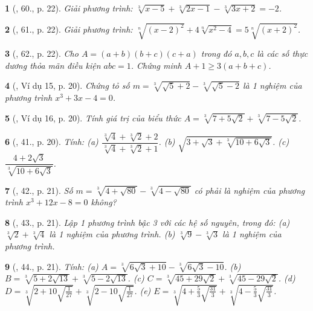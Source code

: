 \documentclass{article}
\newtheorem{baitoan}{}
\begin{document}
\begin{baitoan}[\cite{Tuyen_Toan_9_old}, 60., p. 22]
	Giải phương trình: $\sqrt[3]{x - 5} + \sqrt[3]{2x - 1} - \sqrt[3]{3x + 2} = -2$.
\end{baitoan}

\begin{baitoan}[\cite{Tuyen_Toan_9_old}, 61., p. 22]
	Giải phương trình: $\sqrt[n]{(x - 2)^2} + 4\sqrt[n]{x^2 - 4} = 5\sqrt[n]{(x + 2)^2}$.
\end{baitoan}

\begin{baitoan}[\cite{Tuyen_Toan_9_old}, 62., p. 22]
	Cho $A = (a + b)(b + c)(c + a)$ trong đó $a,b,c$ là các số thực dương thỏa mãn điều kiện $abc = 1$. Chứng minh $A + 1\ge3(a + b + c)$.
\end{baitoan}

\begin{baitoan}[\cite{Binh_Toan_9_tap_1}, Ví dụ 15, p. 20]
	Chứng tỏ số $m = \sqrt[3]{\sqrt{5} + 2} - \sqrt[3]{\sqrt{5} - 2}$ là 1 nghiệm của phương trình $x^3 + 3x - 4 = 0$.
\end{baitoan}

\begin{baitoan}[\cite{Binh_Toan_9_tap_1}, Ví dụ 16, p. 20]
	Tính giá trị của biểu thức $A = \sqrt[3]{7 + 5\sqrt{2}} + \sqrt[3]{7 - 5\sqrt{2}}$.
\end{baitoan}

\begin{baitoan}[\cite{Binh_Toan_9_tap_1}, 41., p. 20]
	Tính: (a) $\dfrac{\sqrt[3]{4} + \sqrt[3]{2} + 2}{\sqrt[3]{4} + \sqrt[3]{2} + 1}$. (b) $\sqrt{3 + \sqrt{3} + \sqrt[3]{10 + 6\sqrt{3}}}$. (c) $\dfrac{4 + 2\sqrt{3}}{\sqrt[3]{10 + 6\sqrt{3}}}$.
\end{baitoan}

\begin{baitoan}[\cite{Binh_Toan_9_tap_1}, 42., p. 21]
	Số $m = \sqrt[3]{4 + \sqrt{80}} - \sqrt[3]{4 - \sqrt{80}}$ có phải là nghiệm của phương trình $x^3 + 12x - 8 = 0$ không?
\end{baitoan}

\begin{baitoan}[\cite{Binh_Toan_9_tap_1}, 43., p. 21]
	Lập 1 phương trình bậc 3 với các hệ số nguyên, trong đó: (a) $\sqrt[3]{2} + \sqrt[3]{4}$ là 1 nghiệm của phương trình. (b) $\sqrt[3]{9} - \sqrt[3]{3}$ là 1 nghiệm của phương trình.
\end{baitoan}

\begin{baitoan}[\cite{Binh_Toan_9_tap_1}, 44., p. 21]
	Tính: (a) $A = \sqrt[3]{6\sqrt{3} + 10} - \sqrt[3]{6\sqrt{3} - 10}$. (b) $B = \sqrt[3]{5 + 2\sqrt{13}} + \sqrt[3]{5 - 2\sqrt{13}}$. (c) $C = \sqrt[3]{45 + 29\sqrt{2}} + \sqrt[3]{45 - 29\sqrt{2}}$. (d) $D = \sqrt[3]{2 + 10\sqrt{\frac{1}{27}}} + \sqrt[3]{2 - 10\sqrt{\frac{1}{27}}}$. (e) $E = \sqrt[3]{4 + \frac{5}{3}\sqrt{\frac{31}{3}}} + \sqrt[3]{4 - \frac{5}{3}\sqrt{\frac{31}{3}}}$.
\end{baitoan}
\end{document}
